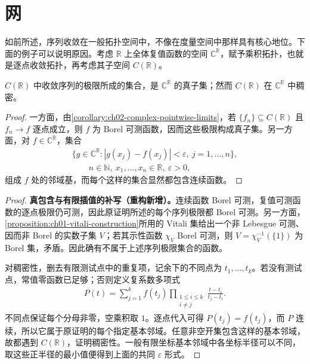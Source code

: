 \documentclass[../../main.tex]{subfiles}%
\begin{document}
\section{网}\label{section:ch04-nets}
如前所述，序列收敛在一般拓扑空间中，不像在度量空间中那样具有核心地位。下面的例子可以说明原因。考虑 $\mathbb R$ 上全体复值函数的空间 $\mathbb C^{\mathbb R}$，赋予乘积拓扑，也就是逐点收敛拓扑，再考虑其子空间 $C(\mathbb R)$。
\begin{proposition}\label{proposition:ch04-continuous-functions-sequential-density}
$C(\mathbb R)$ 中收敛序列的极限所成的集合，是 $\mathbb C^{\mathbb R}$ 的真子集；然而 $C(\mathbb R)$ 在 $\mathbb C^{\mathbb R}$ 中稠密。
\end{proposition}
\begin{proof}
一方面，由\cref{corollary:ch02-complex-pointwise-limits}，若 $\{f_n\}\subseteq C(\mathbb R)$ 且 $f_n\to f$ 逐点成立，则 $f$ 为 Borel 可测函数，因而这些极限构成真子集。另一方面，对 $f\in\mathbb C^{\mathbb R}$，集合
\begin{align*}
\{g\in\mathbb C^{\mathbb R}:|g(x_j)-f(x_j)|<\varepsilon,\ j=1,\ldots,n\},\\
\qquad n\in\mathbb N,\ x_1,\ldots,x_n\in\mathbb R,\ \varepsilon>0,
\end{align*}
组成 $f$ 处的邻域基，而每个这样的集合显然都包含连续函数。
\end{proof}
\begin{proof}
\textbf{真包含与有限插值的补写（重构新增）。}连续函数 Borel 可测，复值可测函数的逐点极限仍可测，因此原证明所述的每个序列极限都 Borel 可测。另一方面，\cref{proposition:ch01-vitali-construction}所用的 Vitali 集给出一个非 Lebesgue 可测、因而非 Borel 的实数子集 $V$；若其示性函数 $\chi_V$ Borel 可测，则 $V=\chi_V^{-1}(\{1\})$ 为 Borel 集，矛盾。因此确有不属于上述序列极限集合的函数。

对稠密性，删去有限测试点中的重复项，记余下的不同点为 $t_1,\ldots,t_k$。若没有测试点，常值零函数已足够；否则定义复系数多项式
\begin{align*}
P(t)=\sum_{j=1}^k f(t_j)\prod_{\substack{1\le i\le k\\i\ne j}}
\frac{t-t_i}{t_j-t_i}.
\end{align*}
不同点保证每个分母非零，空乘积取 $1$。逐点代入可得 $P(t_j)=f(t_j)$，而 $P$ 连续，所以它属于原证明的每个指定基本邻域。任意非空开集包含这样的基本邻域，故都遇到 $C(\mathbb R)$，证明稠密性。一般有限坐标基本邻域中各坐标半径可以不同，取这些正半径的最小值便得到上面的共同 $\varepsilon$ 形式。
\end{proof}
\end{document}
